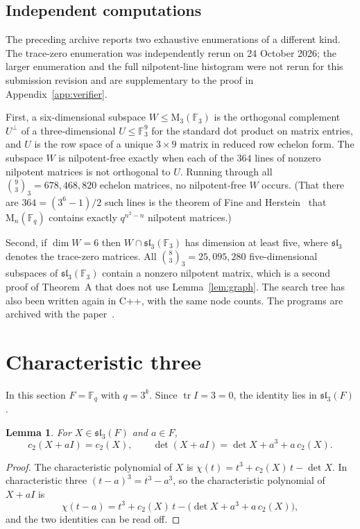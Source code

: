 \documentclass[screen]{aomart}
\newtheorem{lemma}[theorem]{Lemma}
\theoremstyle{definition}
\theoremstyle{remark}
\numberwithin{equation}{section}
\newcommand{\F}{\mathbb{F}}
\newcommand{\M}{\mathrm{M}}
\newcommand{\sll}{\mathfrak{sl}}
\newcommand{\tr}{\operatorname{tr}}
\begin{document}
\subsection{Independent computations}
The preceding archive reports two exhaustive enumerations of a different kind. The trace-zero enumeration was independently rerun on 24 October 2026; the larger enumeration and the full nilpotent-line histogram were not rerun for this submission revision and are supplementary to the proof in Appendix~\ref{app:verifier}.

First, a six-dimensional subspace $W\le\M_3(\F_3)$ is the orthogonal complement $U^\perp$ of a three-dimensional $U\le\F_3^9$ for the standard dot product on matrix entries, and $U$ is the row space of a unique $3\times9$ matrix in reduced row echelon form. The subspace $W$ is nilpotent-free exactly when each of the $364$ lines of nonzero nilpotent matrices is not orthogonal to $U$. Running through all $\binom{9}{3}_3=678{,}468{,}820$ echelon matrices, no nilpotent-free $W$ occurs. (That there are $364=(3^6-1)/2$ such lines is the theorem of Fine and Herstein~\cite{FH} that $\M_n(\F_q)$ contains exactly $q^{n^2-n}$ nilpotent matrices.)

Second, if $\dim W=6$ then $W\cap\sll_3(\F_3)$ has dimension at least five, where $\sll_3$ denotes the trace-zero matrices. All $\binom 83_3=25{,}095{,}280$ five-dimensional subspaces of $\sll_3(\F_3)$ contain a nonzero nilpotent matrix, which is a second proof of Theorem~A that does not use Lemma~\ref{lem:graph}. The search tree has also been written again in C++, with the same node counts. The programs are archived with the paper~\cite{Ar}.

\section{Characteristic three}\label{sec:char3}

In this section $F=\F_q$ with $q=3^k$. Since $\tr I=3=0$, the identity lies in $\sll_3(F)$.

\begin{lemma}\label{lem:shift}
For $X\in\sll_3(F)$ and $a\in F$,
\[
c_2(X+aI)=c_2(X),\qquad \det(X+aI)=\det X+a^3+a\,c_2(X).
\]
\end{lemma}

\begin{proof}
The characteristic polynomial of $X$ is $\chi(t)=t^3+c_2(X)\,t-\det X$. In characteristic three $(t-a)^3=t^3-a^3$, so the characteristic polynomial of $X+aI$ is
\[
\chi(t-a)=t^3+c_2(X)\,t-\bigl(\det X+a^3+a\,c_2(X)\bigr),
\]
and the two identities can be read off.
\end{proof}
\end{document}
